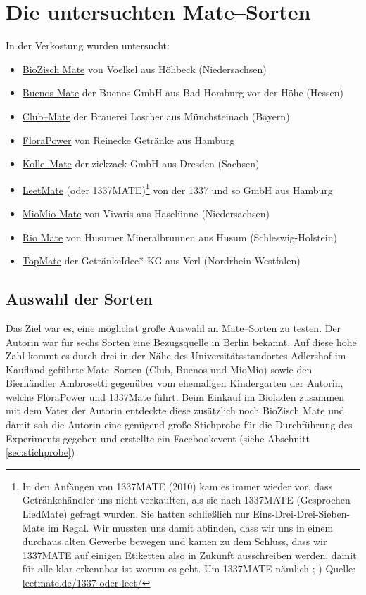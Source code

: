 \documentclass[11pt,a4paper,ngerman]{article}
\begin{document}
\section{Die untersuchten Mate--Sorten}
In der Verkostung wurden untersucht:
\begin{itemize}
 \item \href{http://www.voelkeljuice.de/sortiment/title/biozisch-mate/}{BioZisch Mate} von Voelkel aus Höhbeck (Niedersachsen)
 \item \href{http://www.buenos-icetea.com/buenos-mate/}{Buenos Mate} der Buenos GmbH aus Bad Homburg vor der Höhe (Hessen)
 \item \href{http://www.clubmate.de/}{Club--Mate} der Brauerei Loscher aus Münchsteinach (Bayern)
 \item \href{http://www.flora-power.de/}{FloraPower} von Reinecke Getränke aus Hamburg
 \item \href{http://kolle-mate.de/http://kolle-mate.de/}{Kolle--Mate} der zickzack GmbH aus Dresden (Sachsen)
 \item \href{http://leetmate.de/}{LeetMate} (oder 1337MATE)\footnote{In den Anfängen von 1337MATE (2010) kam es immer wieder vor, dass Getränkehändler uns nicht verkauften, als sie nach 1337MATE (Gesprochen LiedMate) gefragt wurden. Sie hatten schließlich nur Eins-Drei-Drei-Sieben-Mate im Regal.
Wir mussten uns damit abfinden, dass wir uns in einem durchaus alten Gewerbe bewegen und kamen zu dem Schluss, dass wir 1337MATE auf einigen Etiketten also in Zukunft ausschreiben werden, damit für alle klar erkennbar ist worum es geht. Um 1337MATE nämlich ;-) Quelle: \href{http://leetmate.de/1337-oder-leet/}{leetmate.de/1337-oder-leet/} }  von der 1337 und so GmbH aus Hamburg
 \item \href{http://www.vivaris.net/#c17}{MioMio Mate} von Vivaris aus Haselünne (Niedersachsen)
 \item \href{http://www.husumer-mineralbrunnen.de/produkte/rio-mate/}{Rio Mate} von Husumer Mineralbrunnen aus Husum  (Schleswig-Holstein)
 \item \href{http://www.top-mate.de/}{TopMate} der GetränkeIdee* KG aus Verl (Nordrhein-Westfalen)
 \end{itemize}

\subsection{Auswahl der Sorten}
Das Ziel war es, eine möglichst große Auswahl an Mate--Sorten zu testen. Der Autorin war für sechs Sorten eine Bezugsquelle in Berlin bekannt. Auf diese hohe Zahl kommt es durch drei in der Nähe des Universitätsstandortes Adlershof im Kaufland geführte Mate--Sorten (Club, Buenos und MioMio) sowie den Bierhändler \href{http://www.ambrosetti.de/}{Ambrosetti} gegenüber vom ehemaligen Kindergarten der Autorin, welche FloraPower und 1337Mate führt. Beim Einkauf im Bioladen zusammen mit dem Vater der Autorin entdeckte diese zusätzlich noch BioZisch Mate und damit sah die Autorin eine genügend große Stichprobe für die Durchführung des Experiments gegeben und erstellte ein Facebookevent (siehe Abschnitt \ref{sec:stichprobe})
\end{document}
